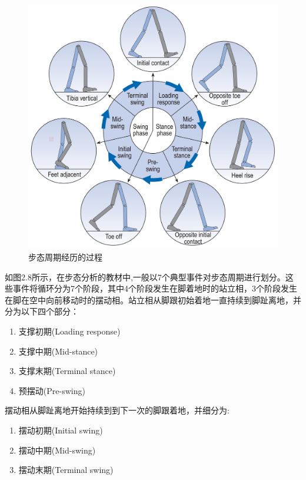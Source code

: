 \begin{figure}[!htb]
    \includegraphics[width=14cm]{fig/f29.jpg}
    \caption{步态周期经历的过程\cite{p44}}
    \label{fig:mark}
\end{figure}

如图2.8所示，在步态分析的教材\cite{p44}中,一般以7个典型事件对步态周期进行划分。这些事件将循环分为7个阶段，其中4个阶段发生在脚着地时的站立相，3个阶段发生在脚在空中向前移动时的摆动相。站立相从脚跟初始着地一直持续到脚趾离地，并分为以下四个部分：
\begin{enumerate}
    \item 支撑初期(Loading response)
    \item 支撑中期(Mid-stance)
    \item 支撑末期(Terminal stance)
    \item 预摆动(Pre-swing)
\end{enumerate}

摆动相从脚趾离地开始持续到到下一次的脚跟着地，并细分为:
\begin{enumerate}
    \item 摆动初期(Initial swing)
    \item 摆动中期(Mid-swing)
    \item 摆动末期(Terminal swing)
\end{enumerate}

